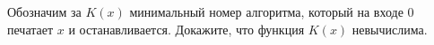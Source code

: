 Обозначим за $K(x)$ минимальный номер алгоритма, который на входе $0$ печатает $x$ и останавливается. Докажите, что функция
$K(x)$ невычислима.
